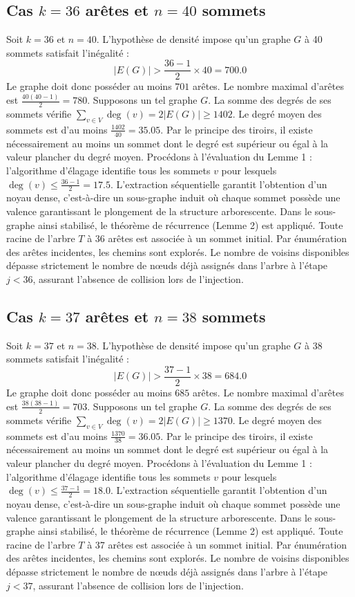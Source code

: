 \documentclass[12pt,a4paper]{article}
\begin{document}
\subsection{Cas $k = 36$ arêtes et $n = 40$ sommets}
Soit $k = 36$ et $n = 40$. L'hypothèse de densité impose qu'un graphe $G$ à 40 sommets satisfait l'inégalité :
$$ |E(G)| > \frac{36-1}{2} \times 40 = 700.0 $$
Le graphe doit donc posséder au moins $701$ arêtes. Le nombre maximal d'arêtes est $\frac{40(40-1)}{2} = 780$.
Supposons un tel graphe $G$. La somme des degrés de ses sommets vérifie $\sum_{v \in V} \deg(v) = 2|E(G)| \geq 1402$.
Le degré moyen des sommets est d'au moins $\frac{1402}{40} = 35.05$.
Par le principe des tiroirs, il existe nécessairement au moins un sommet dont le degré est supérieur ou égal à la valeur plancher du degré moyen.
Procédons à l'évaluation du Lemme 1 : l'algorithme d'élagage identifie tous les sommets $v$ pour lesquels $\deg(v) \leq \frac{36-1}{2} = 17.5$.
L'extraction séquentielle garantit l'obtention d'un noyau dense, c'est-à-dire un sous-graphe induit où chaque sommet possède une valence garantissant le plongement de la structure arborescente.
Dans le sous-graphe ainsi stabilisé, le théorème de récurrence (Lemme 2) est appliqué. Toute racine de l'arbre $T$ à 36 arêtes est associée à un sommet initial. Par énumération des arêtes incidentes, les chemins sont explorés. Le nombre de voisins disponibles dépasse strictement le nombre de nœuds déjà assignés dans l'arbre à l'étape $j < 36$, assurant l'absence de collision lors de l'injection.

\subsection{Cas $k = 37$ arêtes et $n = 38$ sommets}
Soit $k = 37$ et $n = 38$. L'hypothèse de densité impose qu'un graphe $G$ à 38 sommets satisfait l'inégalité :
$$ |E(G)| > \frac{37-1}{2} \times 38 = 684.0 $$
Le graphe doit donc posséder au moins $685$ arêtes. Le nombre maximal d'arêtes est $\frac{38(38-1)}{2} = 703$.
Supposons un tel graphe $G$. La somme des degrés de ses sommets vérifie $\sum_{v \in V} \deg(v) = 2|E(G)| \geq 1370$.
Le degré moyen des sommets est d'au moins $\frac{1370}{38} = 36.05$.
Par le principe des tiroirs, il existe nécessairement au moins un sommet dont le degré est supérieur ou égal à la valeur plancher du degré moyen.
Procédons à l'évaluation du Lemme 1 : l'algorithme d'élagage identifie tous les sommets $v$ pour lesquels $\deg(v) \leq \frac{37-1}{2} = 18.0$.
L'extraction séquentielle garantit l'obtention d'un noyau dense, c'est-à-dire un sous-graphe induit où chaque sommet possède une valence garantissant le plongement de la structure arborescente.
Dans le sous-graphe ainsi stabilisé, le théorème de récurrence (Lemme 2) est appliqué. Toute racine de l'arbre $T$ à 37 arêtes est associée à un sommet initial. Par énumération des arêtes incidentes, les chemins sont explorés. Le nombre de voisins disponibles dépasse strictement le nombre de nœuds déjà assignés dans l'arbre à l'étape $j < 37$, assurant l'absence de collision lors de l'injection.
\end{document}
